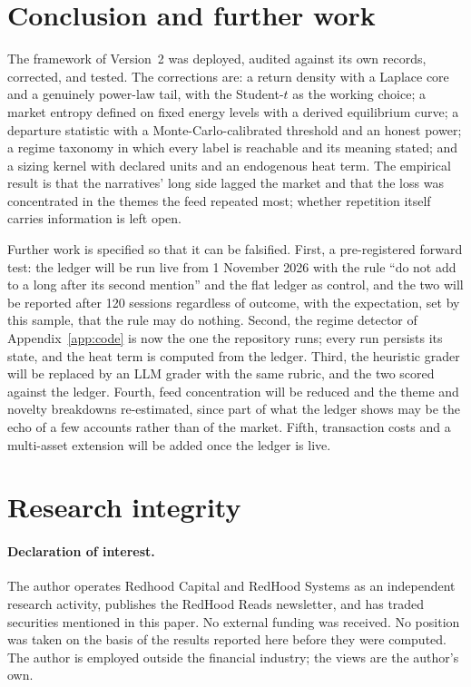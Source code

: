 \documentclass[11pt]{article}
\begin{document}
\section{Conclusion and further work}\label{sec:conclusion}
The framework of Version~2 was deployed, audited against its own records, corrected, and tested. The corrections are: a return density with a Laplace core and a genuinely power-law tail, with the Student-$t$ as the working choice; a market entropy defined on fixed energy levels with a derived equilibrium curve; a departure statistic with a Monte-Carlo-calibrated threshold and an honest power; a regime taxonomy in which every label is reachable and its meaning stated; and a sizing kernel with declared units and an endogenous heat term. The empirical result is that the narratives' long side lagged the market and that the loss was concentrated in the themes the feed repeated most; whether repetition itself carries information is left open.

Further work is specified so that it can be falsified. First, a pre-registered forward test: the ledger will be run live from 1 November 2026 with the rule ``do not add to a long after its second mention'' and the flat ledger as control, and the two will be reported after 120 sessions regardless of outcome, with the expectation, set by this sample, that the rule may do nothing. Second, the regime detector of Appendix~\ref{app:code} is now the one the repository runs; every run persists its state, and the heat term is computed from the ledger. Third, the heuristic grader will be replaced by an LLM grader with the same rubric, and the two scored against the ledger. Fourth, feed concentration will be reduced and the theme and novelty breakdowns re-estimated, since part of what the ledger shows may be the echo of a few accounts rather than of the market. Fifth, transaction costs and a multi-asset extension will be added once the ledger is live.

\section{Research integrity}\label{sec:integrity}
\paragraph{Declaration of interest.} The author operates Redhood Capital and RedHood Systems as an independent research activity, publishes the RedHood Reads newsletter, and has traded securities mentioned in this paper. No external funding was received. No position was taken on the basis of the results reported here before they were computed. The author is employed outside the financial industry; the views are the author's own.
\end{document}
